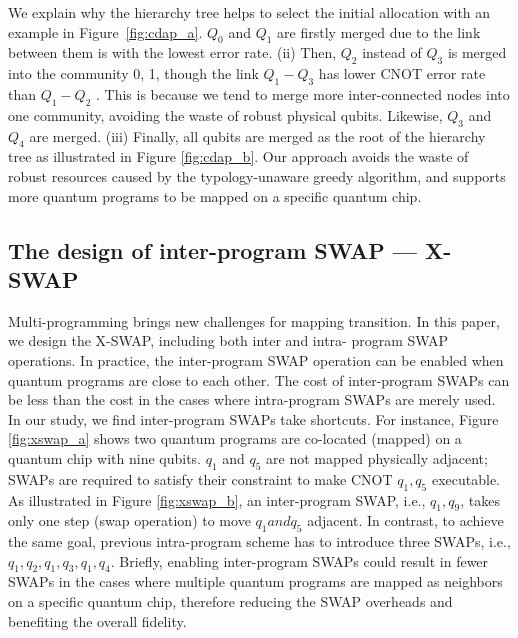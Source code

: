 \documentclass[10pt,twocolumn]{article}
\begin{document}
	We explain why the hierarchy tree helps to select the initial allocation with an example in Figure~\ref{fig:cdap_a}. $Q_0$ and $Q_1$ are firstly merged
	due to the link between them is with the lowest error rate. (ii) Then,
	$Q_2$ instead of $Q_3$ is merged into the community {0, 1}, though the
	link $Q_1 -Q_3$ has lower CNOT error rate than $Q_1 -Q_2$ . This is because
	we tend to merge more inter-connected nodes into one community,
	avoiding the waste of robust physical qubits. Likewise, $Q_3$ and $Q_4$
	are merged. (iii) Finally, all qubits are merged as the root of the
	hierarchy tree as illustrated in Figure \ref{fig:cdap_b}. Our approach avoids the
	waste of robust resources caused by the typology-unaware greedy
	algorithm, and supports more quantum programs to be mapped on
	a specific quantum chip.
	\subsection{The design of inter-program SWAP --- X-SWAP}
	Multi-programming brings new challenges for mapping transition.
	In this paper, we design the X-SWAP, including both inter and intra-
	program SWAP operations. In practice, the inter-program SWAP
	operation can be enabled when quantum programs are close to
	each other. The cost of inter-program SWAPs can be less than the
	cost in the cases where intra-program SWAPs are merely used.
	In our study, we find inter-program SWAPs take shortcuts. For
	instance, Figure \ref{fig:xswap_a} shows two quantum programs are co-located
	(mapped) on a quantum chip with nine qubits. $q_1$ and $q_5$ are not
	mapped physically adjacent; SWAPs are required to satisfy their
	constraint to make CNOT $q_1 , q_5$ executable. As illustrated in Figure
	\ref{fig:xswap_b}, an inter-program SWAP, i.e., ${q_1 , q_9 }$, takes only one step (swap
	operation) to move $q_1 and q_5$ adjacent. In contrast, to achieve the
	same goal, previous intra-program scheme has to introduce three
	SWAPs, i.e., ${q_1 , q_2 }, {q_1 , q_3 }, {q_1 , q_4 }$. Briefly, enabling inter-program
	SWAPs could result in fewer SWAPs in the cases where multiple
	quantum programs are mapped as neighbors on a specific quantum
	chip, therefore reducing the SWAP overheads and benefiting the
	overall fidelity. 
\end{document}

